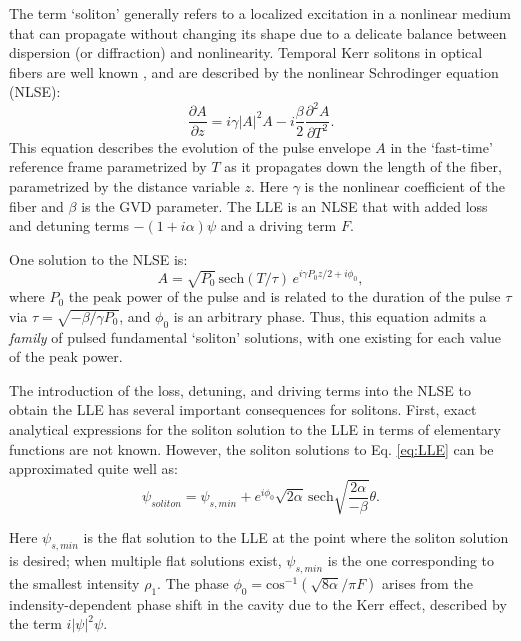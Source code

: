 The term `soliton' generally refers to a localized excitation in a nonlinear medium that can propagate without changing its shape due to a delicate balance between dispersion (or diffraction) and nonlinearity. Temporal Kerr solitons in optical fibers are well known \cite{Agrawal2007}, and are described by the nonlinear Schrodinger equation (NLSE):
\begin{equation}
\frac{\partial A}{\partial z}= i\gamma|A|^2 A -i \frac{\beta}{2} \frac{\partial^2 A}{\partial T^2}. \label{NLSE}
\end{equation}
This equation describes the evolution of the pulse envelope $A$ in the `fast-time' reference frame parametrized by $T$ as it propagates down the length of the fiber, parametrized by the distance variable $z$. Here $\gamma$ is the nonlinear coefficient of the fiber and $\beta$ is the GVD parameter. The LLE is an NLSE that with added loss and detuning terms $-(1+i\alpha)\psi$ and a driving term $F$.

One solution to the NLSE is:
\begin{equation}
A=\sqrt{P_0}\, \mathrm{sech}\left(T/\tau\right)\,e^{i\gamma P_0 z/2+i\phi_0},
\end{equation}
where $P_0$ the peak power of the pulse and is related to the duration of the pulse $\tau$ via $\tau=\sqrt{-\beta/\gamma P_0}$, and $\phi_0$ is an arbitrary phase. Thus, this equation admits a \textit{family} of pulsed fundamental `soliton' solutions, with one existing for each value of the peak power. 

The introduction of the loss, detuning, and driving terms into the NLSE to obtain the LLE has several important consequences for solitons. First, exact analytical expressions for the soliton solution to the LLE in terms of elementary functions are not known. However, the soliton solutions to Eq. \ref{eq:LLE} can be approximated quite well as:
\begin{equation}
\psi_{soliton}=\psi_{s,min}+e^{i\phi_0}\sqrt{2\alpha}\,\mathrm{sech}\sqrt{\frac{2\alpha}{-\beta}}\theta.
\end{equation}

Here $\psi_{s,min}$ is the flat solution to the LLE at the point where the soliton solution is desired; when multiple flat solutions exist, $\psi_{s,min}$ is the one corresponding to the smallest intensity $\rho_1$. The phase $\phi_0=\mathrm{cos}^{-1}(\sqrt{8\alpha}/\pi F)$ arises from the indensity-dependent phase shift in the cavity due to the Kerr effect, described by the term $i|\psi|^2\psi$. 

